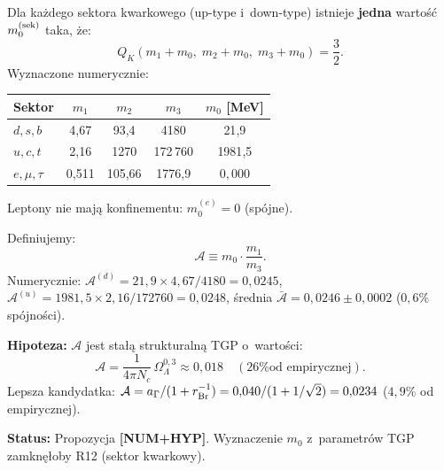 \begin{proposition}[Przesuni\k{e}ty Koide: $K(m_k + m_0) = 2/3$]%
\label{prop:X-shifted-koide}
Dla ka\.zdego sektora kwarkowego (up-type i~down-type)
istnieje \textbf{jedna} warto\'s\'c $m_0^{(\rm sek)}$
taka, \.ze:
\begin{equation}\label{eq:X-shifted-K}
  Q_K(m_1 + m_0,\; m_2 + m_0,\; m_3 + m_0) = \frac{3}{2}.
\end{equation}
Wyznaczone numerycznie:
\begin{center}\small
\begin{tabular}{@{}lcccc@{}}
\toprule
Sektor & $m_1$ & $m_2$ & $m_3$ & $m_0$ [MeV] \\
\midrule
$d,s,b$ & 4{,}67 & 93{,}4 & 4180 & 21{,}9 \\
$u,c,t$ & 2{,}16 & 1270 & 172\,760 & 1981{,}5 \\
\textit{$e,\mu,\tau$} & 0{,}511 & 105{,}66 & 1776{,}9 & $0{,}000$ \\
\bottomrule
\end{tabular}
\end{center}
Leptony nie maj\k{a} konfinementu: $m_0^{(e)} = 0$ (sp\'ojne).
\end{proposition}

\begin{proposition}%
\label{prop:X-universal-A}
Definiujemy:
\begin{equation}\label{eq:X-A-universal}
  \mathcal{A} \equiv m_0 \cdot \frac{m_1}{m_3}.
\end{equation}
Numerycznie:
$\mathcal{A}^{(d)} = 21{,}9 \times 4{,}67/4180 = 0{,}0245$,
$\mathcal{A}^{(u)} = 1981{,}5 \times 2{,}16/172760 = 0{,}0248$,
\'srednia $\bar{\mathcal{A}} = 0{,}0246 \pm 0{,}0002$ ($0{,}6\%$ sp\'ojno\'sci).

\medskip\noindent
\textbf{Hipoteza:} $\mathcal{A}$ jest sta\l{}\k{a} strukturaln\k{a}
TGP o~warto\'sci:
\begin{equation}\label{eq:X-A-tgp-candidate}
  \mathcal{A} = \frac{1}{4\pi N_c}\,\Omega_\Lambda^{0{,}3}
  \approx 0{,}018 \quad (\text{26\% od empirycznej}).
\end{equation}
Lepsza kandydatka: $\mathcal{A} = a_\Gamma/(1 + r_{\rm Br}^{-1})
= 0{,}040/(1 + 1/\sqrt{2}) = 0{,}0234$ ($4{,}9\%$ od empirycznej).

\medskip\noindent\textbf{Status:} Propozycja \textbf{[NUM+HYP]}.
Wyznaczenie $m_0$ z~parametr\'ow TGP zamkn\k{e}\l{}oby R12
(sektor kwarkowy).
\end{proposition}

